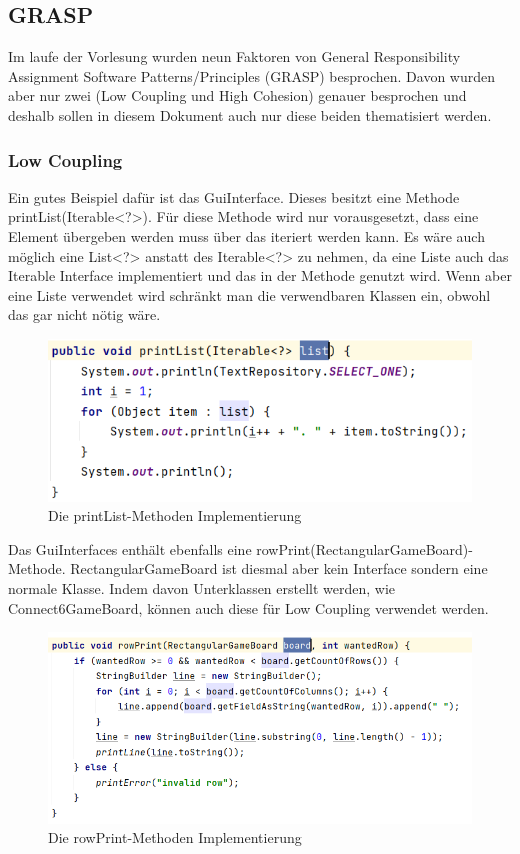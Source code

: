 \documentclass[12pt]{article}
\begin{document}
\subsection{GRASP}
Im laufe der Vorlesung wurden neun Faktoren von General Responsibility Assignment Software Patterns/Principles (GRASP) besprochen. Davon wurden aber nur zwei (Low Coupling und High Cohesion) genauer besprochen und deshalb sollen in diesem Dokument auch nur diese beiden thematisiert werden.



\subsubsection{Low Coupling}
Ein gutes Beispiel dafür ist das GuiInterface. Dieses besitzt eine Methode printList(Iterable<?>). Für diese Methode wird nur vorausgesetzt, dass eine Element übergeben werden muss über das iteriert werden kann. Es wäre auch möglich eine List<?> anstatt des Iterable<?> zu nehmen, da eine Liste auch das Iterable Interface implementiert und das in der Methode genutzt wird. Wenn aber eine Liste verwendet wird schränkt man die verwendbaren Klassen ein, obwohl das gar nicht nötig wäre.
\\

\begin{figure}[H]
\centering
\includegraphics[width=12cm]{Bilder/printList}
\caption{Die printList-Methoden Implementierung}
\label{fig:printList}
\end{figure}


Das GuiInterfaces enthält ebenfalls eine rowPrint(RectangularGameBoard)-Methode. RectangularGameBoard ist diesmal aber kein Interface sondern eine normale Klasse. Indem davon Unterklassen erstellt werden, wie Connect6GameBoard, können auch diese für Low Coupling verwendet werden. 
\\

\begin{figure}[H]
\centering
\includegraphics[width=13cm]{Bilder/rowPrint}
\caption{Die rowPrint-Methoden Implementierung}
\label{fig:rowPrint}
\end{figure}
\end{document}
